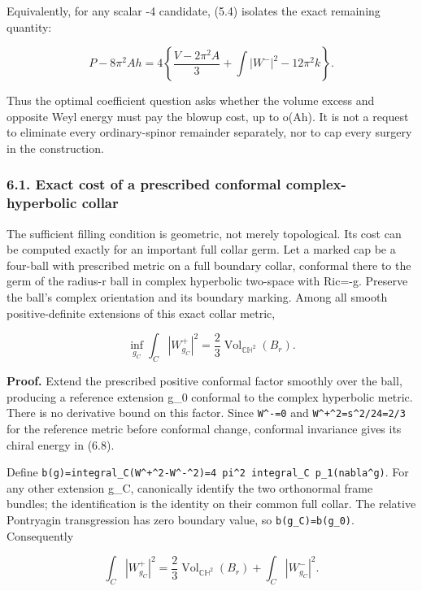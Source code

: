 \documentclass[
  10pt,
]{article}
\begin{document}
Equivalently, for any scalar -4 candidate, (5.4) isolates the exact
remaining quantity:

\[
 P-8\pi^2Ah
 =4\left\{\frac{V-2\pi^2 A}{3}
                    +\int|W^-|^2-12\pi^2 k\right\}. \tag{6.7}
\]

Thus the optimal coefficient question asks whether the volume excess and
opposite Weyl energy must pay the blowup cost, up to o(Ah). It is not a
request to eliminate every ordinary-spinor remainder separately, nor to
cap every surgery in the construction.

\hypertarget{exact-cost-of-a-prescribed-conformal-complex-hyperbolic-collar}{%
\subsubsection{6.1. Exact cost of a prescribed conformal
complex-hyperbolic
collar}\label{exact-cost-of-a-prescribed-conformal-complex-hyperbolic-collar}}

The sufficient filling condition is geometric, not merely topological.
Its cost can be computed exactly for an important full collar germ. Let
a marked cap be a four-ball with prescribed metric on a full boundary
collar, conformal there to the germ of the radius-r ball in complex
hyperbolic two-space with Ric=-g. Preserve the ball's complex
orientation and its boundary marking. Among all smooth positive-definite
extensions of this exact collar metric,

\[
 \boxed{\inf_{g_C}\int_C|W_{g_C}^+|^2
              =\frac23\operatorname{Vol}_{\mathbb{CH}^2}(B_r).} \tag{6.8}
\]

\textbf{Proof.} Extend the prescribed positive conformal factor smoothly
over the ball, producing a reference extension g\_0 conformal to the
complex hyperbolic metric. There is no derivative bound on this factor.
Since \texttt{W\^{}-=0} and
\texttt{\textbar{}W\^{}+\textbar{}\^{}2=s\^{}2/24=2/3} for the reference
metric before conformal change, conformal invariance gives its chiral
energy in (6.8).

Define
\texttt{b(g)=integral\_C(\textbar{}W\^{}+\textbar{}\^{}2-\textbar{}W\^{}-\textbar{}\^{}2)=4\ pi\^{}2\ integral\_C\ p\_1(nabla\^{}g)}.
For any other extension g\_C, canonically identify the two orthonormal
frame bundles; the identification is the identity on their common full
collar. The relative Pontryagin transgression has zero boundary value,
so \texttt{b(g\_C)=b(g\_0)}. Consequently

\[
 \int_C|W_{g_C}^+|^2
       =\frac23\operatorname{Vol}_{\mathbb{CH}^2}(B_r)
                      +\int_C|W_{g_C}^-|^2.          \tag{6.9}
\]
\end{document}
